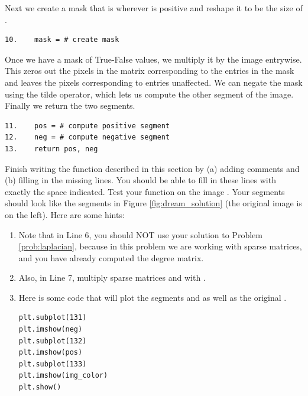 Next we create a mask that is  wherever  is positive and reshape it to be the size of . 
\begin{lstlisting}
10.    mask = # create mask
\end{lstlisting}
Once we have a mask of True-False values, we multiply it by the image entrywise. This zeros out the pixels in the matrix corresponding to the  entries in the mask and leaves the pixels corresponding to  entries unaffected. We can negate the mask using the tilde operator, which lets us compute the other segment of the image. Finally we return the two segments.
\begin{lstlisting}
11.    pos = # compute positive segment
12.    neg = # compute negative segment
13.    return pos, neg
\end{lstlisting}



\begin{problem} Finish writing the function  described in this section by (a) adding comments and (b) filling in the missing lines. 
You should be able to fill in these lines with exactly the space indicated. Test your function on the image . Your segments should look like the segments in Figure \ref{fig:dream_solution} (the original image is on the left). Here are some hints:

\begin{enumerate}
\item Note that in Line 6, you should NOT use your solution to Problem \ref{prob:laplacian}, because in this problem we are working with sparse matrices, and you have already computed the degree matrix.

\item Also, in Line 7, multiply sparse matrices  and  with .
\item Here is some code that will plot the segments  and  as well as the original .
\begin{lstlisting}
plt.subplot(131)
plt.imshow(neg)
plt.subplot(132)
plt.imshow(pos)
plt.subplot(133)
plt.imshow(img_color)
plt.show()
\end{lstlisting}

\end{enumerate}

\end{problem}

